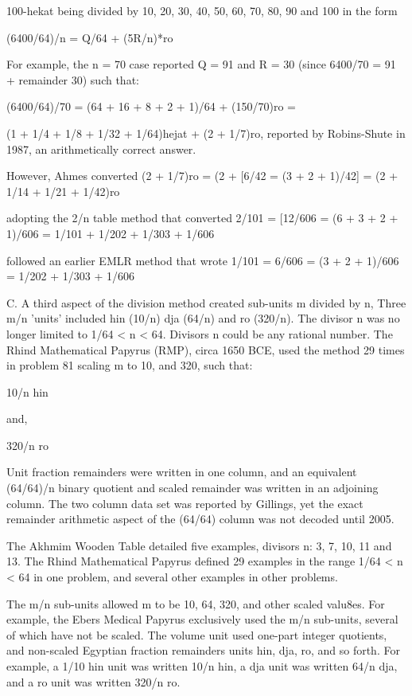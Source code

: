\documentclass[12pt]{article}
\begin{document}
100-hekat being divided by 10, 20, 30, 40, 50, 60, 70, 80, 90 and 100 in the form

(6400/64)/n = Q/64 + (5R/n)*ro

For example, the n = 70 case reported Q = 91 and R = 30 (since 6400/70 = 91 + remainder 30) such that:

(6400/64)/70 = (64 + 16 + 8 + 2 + 1)/64 + (150/70)ro =

(1 + 1/4 + 1/8 + 1/32 + 1/64)hejat + (2 + 1/7)ro, reported by Robins-Shute in 1987, an arithmetically correct answer.

However, Ahmes converted (2 + 1/7)ro = (2 + [6/42 = (3 + 2 + 1)/42] = (2 + 1/14 + 1/21 + 1/42)ro 

adopting the 2/n table method that converted 2/101 = [12/606 = (6 + 3 + 2 + 1)/606 = 1/101 + 1/202 + 1/303 + 1/606  

followed an earlier EMLR method that wrote 1/101 = 6/606 = (3 + 2 + 1)/606 = 1/202 + 1/303 + 1/606

C. A third aspect of the division method created sub-units m divided by n, Three m/n 'units' included hin (10/n) dja (64/n) and ro (320/n). The divisor n was no longer limited to 1/64 < n < 64. Divisors n could be any rational number. The Rhind Mathematical Papyrus (RMP), circa 1650 BCE, used the method 29 times in problem 81 scaling m to 10, and 320, such that:

10/n hin 

and,

320/n ro

Unit fraction remainders were written in one column, and an equivalent (64/64)/n binary quotient and scaled remainder was written in an adjoining column. The two column data set was reported by Gillings, yet the exact remainder arithmetic aspect of the (64/64) column was not decoded until 2005.

The Akhmim Wooden Table detailed five examples, divisors n: 3, 7, 10, 11 and 13. The Rhind Mathematical Papyrus defined 29 examples in the range 1/64 < n < 64 in one problem, and several other examples in other problems.

The m/n sub-units allowed m to be 10, 64, 320, and other scaled valu8es. For example, the Ebers Medical Papyrus exclusively used the m/n sub-units, several of which have not be scaled. The volume unit used one-part integer quotients, and non-scaled Egyptian fraction remainders units hin, dja, ro, and so forth. For example, a 1/10 hin unit was written 10/n hin, a dja unit was written 64/n dja, and a ro unit was written 320/n ro.
\end{document}
